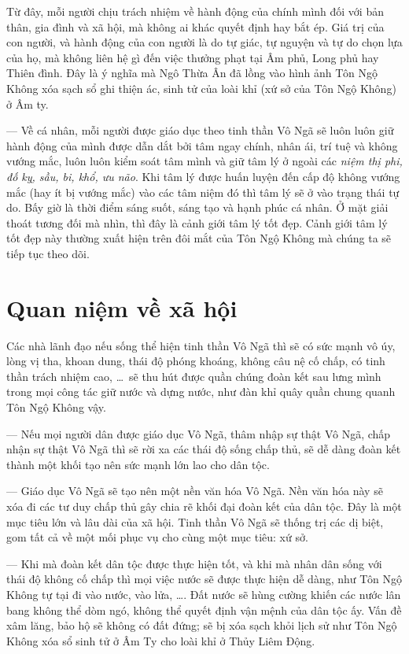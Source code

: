 Từ đây, mỗi người chịu trách nhiệm về hành động của chính mình đối với bản thân, gia đình và xã hội, mà không ai khác quyết định hay bắt ép. Giá trị của con người, và hành động của con người là do tự giác, tự nguyện và tự do chọn lựa của họ, mà không liên hệ gì đến việc thưởng phạt tại Âm phủ, Long phủ hay Thiên đình. Đây là ý nghĩa mà Ngô Thừa Ân đã lồng vào hình ảnh Tôn Ngộ Không xóa sạch sổ ghi thiện ác, sinh tử của loài khỉ (xứ sở của Tôn Ngộ Không) ở Âm ty.

--- Về cá nhân, mỗi người được giáo dục theo tinh thần Vô Ngã sẽ luôn luôn giữ hành động của mình được dẫn dắt bởi tâm ngay chính, nhân ái, trí tuệ và không vướng mắc, luôn luôn kiểm soát tâm mình và giữ tâm lý ở ngoài các \emph{niệm thị phi, đố kỵ, sầu, bi, khổ, ưu não}. Khi tâm lý được huấn luyện đến cấp độ không vướng mắc (hay ít bị vướng mắc) vào các tâm niệm đó thì tâm lý sẽ ở vào trạng thái tự do. Bấy giờ là thời điểm sáng suốt, sáng tạo và hạnh phúc cá nhân. Ở mặt giải thoát tương đối mà nhìn, thì đây là cảnh giới tâm lý tốt đẹp. Cảnh giới tâm lý tốt đẹp này thường xuất hiện trên đôi mắt của Tôn Ngộ Không mà chúng ta sẽ tiếp tục theo dõi.


\section{Quan niệm về xã hội} %
\label{sec:3_xa_hoi}

Các nhà lãnh đạo nếu sống thể hiện tinh thần Vô Ngã thì sẽ có sức mạnh vô úy, lòng vị tha, khoan dung, thái độ phóng khoáng, không câu nệ cố chấp, có tinh thần trách nhiệm cao, \ldots ~sẽ thu hút được quần chúng đoàn kết sau lưng mình trong mọi công tác giữ nước và dựng nước, như đàn khỉ quây quần chung quanh Tôn Ngộ Không vậy.

--- Nếu mọi người dân được giáo dục Vô Ngã, thâm nhập sự thật Vô Ngã, chấp nhận sự thật Vô Ngã thì sẽ rời xa các thái độ sống chấp thủ, sẽ dễ dàng đoàn kết thành một khối tạo nên sức mạnh lớn lao cho dân tộc.

--- Giáo dục Vô Ngã sẽ tạo nên một nền văn hóa Vô Ngã. Nền văn hóa này sẽ xóa đi các tư duy chấp thủ gây chia rẽ khối đại đoàn kết của dân tộc. Đây là một mục tiêu lớn và lâu dài của xã hội. Tinh thần Vô Ngã sẽ thống trị các dị biệt, gom tất cả về một mối phục vụ cho cùng một mục tiêu: xứ sở.

--- Khi mà đoàn kết dân tộc được thực hiện tốt, và khi mà nhân dân sống với thái độ không cố chấp thì mọi việc nước sẽ được thực hiện dễ dàng, như Tôn Ngộ Không tự tại đi vào nước, vào lửa, \ldots. Đất nước sẽ hùng cường khiến các nước lân bang không thể dòm ngó, không thể quyết định vận mệnh của dân tộc ấy. Vấn đề xâm lăng, bảo hộ sẽ không có đất đứng; sẽ bị xóa sạch khỏi lịch sử như Tôn Ngộ Không xóa sổ sinh tử ở Âm Ty cho loài khỉ ở Thủy Liêm Động.

